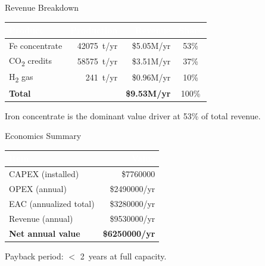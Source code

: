 \documentclass[aspectratio=169]{beamer}
\begin{document}
\begin{frame}{Revenue Breakdown}
\begin{table}
\centering
\begin{tabular}{@{}lrrc@{}}
\toprule
\textbf{\textcolor{white}{Product}} & \textbf{\textcolor{white}{Production}} & \textbf{\textcolor{white}{Revenue}} & \textbf{\textcolor{white}{Share}} \\
\midrule
Fe concentrate & \num{42075}~t/yr & \textcolor{StepGreen}{\$5.05M/yr} & 53\% \\
CO\textsubscript{2} credits & \num{58575}~t/yr & \textcolor{StepGreen}{\$3.51M/yr} & 37\% \\
H\textsubscript{2} gas & \SI{241}{t/yr} & \textcolor{StepGreen}{\$0.96M/yr} & 10\% \\
\midrule
\textbf{Total} & & \textcolor{StepGreen}{\textbf{\$9.53M/yr}} & 100\% \\
\bottomrule
\end{tabular}
\end{table}
\vspace{10pt}
\centering
\small Iron concentrate is the dominant value driver at 53\% of total revenue.
\end{frame}

\begin{frame}{Economics Summary}
\begin{table}
\centering
\begin{tabular}{@{}lr@{}}
\toprule
\textbf{\textcolor{white}{Item}} & \textbf{\textcolor{white}{Value}} \\
\midrule
\textcolor{StepRed}{CAPEX (installed)} & \$\num{7760000} \\
\textcolor{StepRed}{OPEX (annual)} & \$\num{2490000}/yr \\
\textcolor{StepRed}{EAC (annualized total)} & \$\num{3280000}/yr \\
\midrule
\textcolor{StepGreen}{Revenue (annual)} & \$\num{9530000}/yr \\
\textcolor{StepGreen}{\textbf{Net annual value}} & \textbf{\$\num{6250000}/yr} \\
\bottomrule
\end{tabular}
\end{table}
\vspace{8pt}
\centering
\small Payback period: $<$ 2~years at full capacity.
\end{frame}
\end{document}
